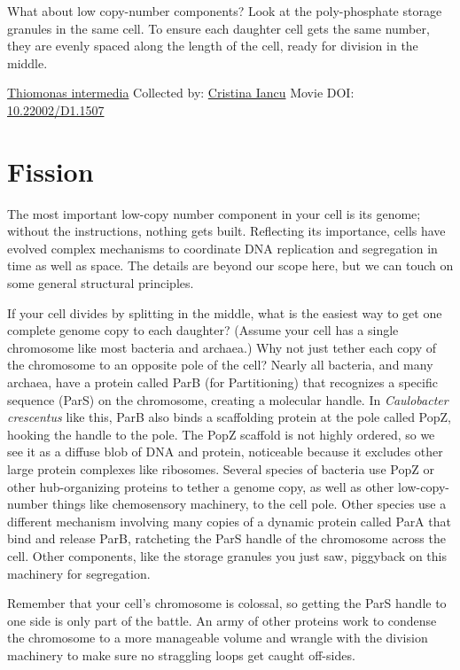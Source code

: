 \documentclass[]{tufte-book}
\begin{document}
What about low copy-number components? Look at the poly-phosphate storage granules in the same cell. To ensure each daughter cell gets the same number, they are evenly spaced along the length of the cell, ready for division in the middle.



\hypertarget{htmlwidget-c3878fb7359fed8b0780}{}

\label{fig:5-1}\protect\hyperlink{tree}{Thiomonas intermedia} Collected by: \protect\hyperlink{cristina_iancu}{Cristina Iancu} Movie DOI: \href{https://doi.org/10.22002/D1.1507}{10.22002/D1.1507}

\hypertarget{fission}{%
\section{Fission}\label{fission}}

The most important low-copy number component in your cell is its genome; without the instructions, nothing gets built. Reflecting its importance, cells have evolved complex mechanisms to coordinate DNA replication and segregation in time as well as space. The details are beyond our scope here, but we can touch on some general structural principles.

If your cell divides by splitting in the middle, what is the easiest way to get one complete genome copy to each daughter? (Assume your cell has a single chromosome like most bacteria and archaea.) Why not just tether each copy of the chromosome to an opposite pole of the cell? Nearly all bacteria, and many archaea, have a protein called ParB (for Partitioning) that recognizes a specific sequence (ParS) on the chromosome, creating a molecular handle. In \emph{Caulobacter crescentus} like this, ParB also binds a scaffolding protein at the pole called PopZ, hooking the handle to the pole. The PopZ scaffold is not highly ordered, so we see it as a diffuse blob of DNA and protein, noticeable because it excludes other large protein complexes like ribosomes. Several species of bacteria use PopZ or other hub-organizing proteins to tether a genome copy, as well as other low-copy-number things like chemosensory machinery, to the cell pole. Other species use a different mechanism involving many copies of a dynamic protein called ParA that bind and release ParB, ratcheting the ParS handle of the chromosome across the cell. Other components, like the storage granules you just saw, piggyback on this machinery for segregation.

Remember that your cell's chromosome is colossal, so getting the ParS handle to one side is only part of the battle. An army of other proteins work to condense the chromosome to a more manageable volume and wrangle with the division machinery to make sure no straggling loops get caught off-sides.
\end{document}
